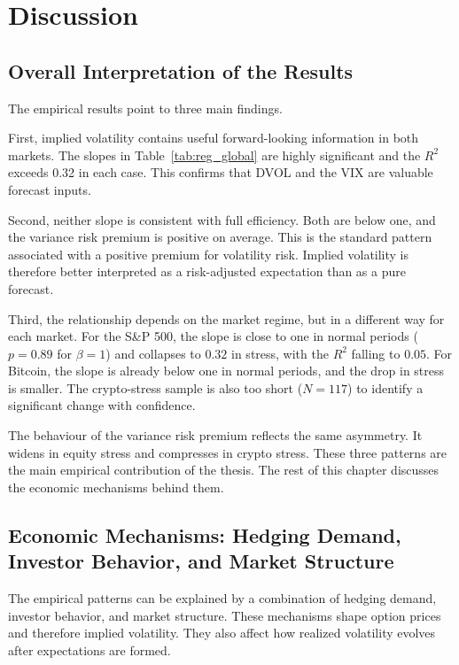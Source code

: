 \documentclass[11pt,a4paper,openany]{report}
\begin{document}
\chapter{Discussion}\label{discussion}

\section{Overall Interpretation of the
Results}\label{overall-interpretation-of-the-results}

The empirical results point to three main findings.

First, implied volatility contains useful forward-looking information
in both markets. The slopes in Table~\ref{tab:reg_global} are highly
significant and the $R^2$ exceeds 0.32 in each case. This confirms
that DVOL and the VIX are valuable forecast inputs.

Second, neither slope is consistent with full efficiency. Both are
below one, and the variance risk premium is positive on average. This
is the standard pattern associated with a positive premium for
volatility risk. Implied volatility is therefore better interpreted as
a risk-adjusted expectation than as a pure forecast.

Third, the relationship depends on the market regime, but in a
different way for each market. For the S\&P 500, the slope is close
to one in normal periods ($p=0.89$ for $\beta=1$) and collapses to
$0.32$ in stress, with the $R^2$ falling to $0.05$. For Bitcoin, the
slope is already below one in normal periods, and the drop in stress
is smaller. The crypto-stress sample is also too short ($N=117$) to
identify a significant change with confidence.

The behaviour of the variance risk premium reflects the same
asymmetry. It widens in equity stress and compresses in crypto stress.
These three patterns are the main empirical contribution of the
thesis. The rest of this chapter discusses the economic mechanisms
behind them.

\section{Economic Mechanisms: Hedging Demand, Investor Behavior, and
Market
Structure}\label{economic-mechanisms-hedging-demand-investor-behavior-and-market-structure}

The empirical patterns can be explained by a combination of hedging
demand, investor behavior, and market structure. These mechanisms shape
option prices and therefore implied volatility. They also affect how
realized volatility evolves after expectations are formed.
\end{document}
